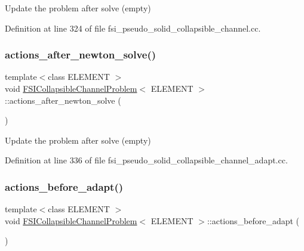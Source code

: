 Update the problem after solve (empty) 



Definition at line 324 of file fsi\+\_\+pseudo\+\_\+solid\+\_\+collapsible\+\_\+channel.\+cc.

\mbox{\label{classFSICollapsibleChannelProblem_a49780267c05f4c6ecbed11bfc6b9956b}} 
\subsubsection{\texorpdfstring{actions\+\_\+after\+\_\+newton\+\_\+solve()}{actions\_after\_newton\_solve()}\hspace{0.1cm}{\footnotesize\ttfamily [4/4]}}
{\footnotesize\ttfamily template$<$class E\+L\+E\+M\+E\+NT $>$ \\
void \hyperlink{classFSICollapsibleChannelProblem}{F\+S\+I\+Collapsible\+Channel\+Problem}$<$ E\+L\+E\+M\+E\+NT $>$\+::actions\+\_\+after\+\_\+newton\+\_\+solve (\begin{DoxyParamCaption}{ }\end{DoxyParamCaption})\hspace{0.3cm}{\ttfamily [inline]}}



Update the problem after solve (empty) 



Definition at line 336 of file fsi\+\_\+pseudo\+\_\+solid\+\_\+collapsible\+\_\+channel\+\_\+adapt.\+cc.

\mbox{\label{classFSICollapsibleChannelProblem_a91b30b3d0369c178d3a79f5658644f1b}} 
\subsubsection{\texorpdfstring{actions\+\_\+before\+\_\+adapt()}{actions\_before\_adapt()}\hspace{0.1cm}{\footnotesize\ttfamily [1/2]}}
{\footnotesize\ttfamily template$<$class E\+L\+E\+M\+E\+NT $>$ \\
void \hyperlink{classFSICollapsibleChannelProblem}{F\+S\+I\+Collapsible\+Channel\+Problem}$<$ E\+L\+E\+M\+E\+NT $>$\+::actions\+\_\+before\+\_\+adapt (\begin{DoxyParamCaption}{ }\end{DoxyParamCaption})}



